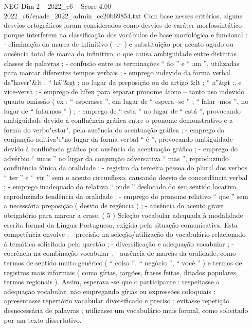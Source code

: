 \begin{textsample}{NEG Dim 2 – 2022\_c6 – Score 4.00 – 2022\_c6/enade\_2022\_admin\_cc20b69854.txt}
Com base nesses critérios, alguns desvios ortográficos foram considerados como desvios de caráter morfossintático porque interferem na classificação dos vocábulos de base morfológica e funcional : - eliminação da marca de infinitivo ( -r- ) e substituição por acento agudo ou ausência total de marca do infinitivo, o que causa ambiguidade entre distintas classes de palavras ; - confusão entre as terminações “ ão ” e “ am ”, utilizadas para marcar diferentes tempos verbais ; - emprego indevido da forma verbal de"haver"\&lt ; “ há”\&gt ; no lugar da preposição ou do artigo \&lt ; “ a”\&gt ;, e vice-versa ; - emprego de hífen para separar pronome átono – tanto uso indevido quanto omissão ( ex : “ esperasse ”, em lugar de “ espera -se ” ; “ falar -mos ”, no lugar de “ falarmos ” ) ; - emprego de “ esta ” no lugar de “ está ”, provocando ambiguidade devido à confluência gráfica entre o pronome demonstrativo e a forma do verbo"estar", pela ausência da acentuação gráfica ; - emprego da conjunção aditiva"e"no lugar da forma verbal “ é ”, provocando ambiguidade devido à confluência gráfica por ausência da acentuação gráfica ; - emprego do advérbio “ mais ” no lugar da conjunção adversativa “ mas ”, reproduzindo confluência fônica da oralidade ; - registro da terceira pessoa do plural dos verbos “ ter ” e “ vir ” sem o acento circunflexo, causando desvio de concordância verbal ; - emprego inadequado do relativo “ onde ” deslocado do seu sentido locativo, reproduzindo tendência da oralidade ; - emprego do pronome relativo “ que ” sem a necessária preposição ( desvio de regência ) ; - ausência do acento grave obrigatório para marcar a crase. ( 5 ) Seleção vocabular adequada à modalidade escrita formal da Língua Portuguesa, exigida pela situação comunicativa.
Esta competência envolve : - precisão na seleção/utilização do vocabulário relacionado à temática solicitada pela questão ; - diversificação e adequação vocabular ; - coerência na combinação vocabular ; - ausência de marcas da oralidade, como termos de sentido muito genérico ( “ coisa ”, “ negócio ”, “ você ” ) e termos de registros mais informais ( como gírias, jargões, frases feitas, ditados populares, termos regionais ).
Assim, esperava -se que o participante : respeitasse a adequação vocabular, não empregando gírias ou expressões coloquiais ; apresentasse repertório vocabular diversificado e preciso ; evitasse repetição desnecessária de palavras ; utilizasse um vocabulário mais formal, como solicitado por um texto dissertativo.

\end{textsample}

